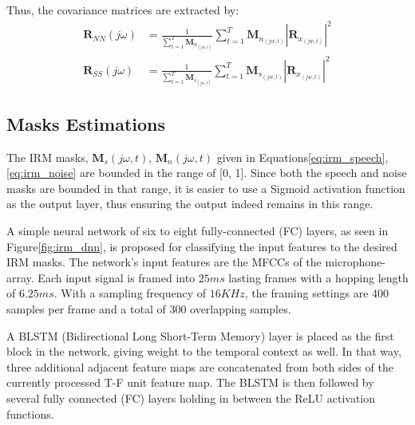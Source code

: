 %
Thus, the covariance matrices are extracted by:
\begin{align}
    \mathbf{R}_{NN}(j\omega) & = \frac{1}{\sum\limits_{t=1}^{T}\mathbf{M}_{n_{(jw, t)}}}\sum_{t=1}^{T}\mathbf{M}_{n_{(jw, t)}}|\mathbf{R}_{x_{(jw, t)}}|^2\\
    \mathbf{R}_{SS}(j\omega) & = \frac{1}{\sum\limits_{t=1}^{T}\mathbf{M}_{s_{(jw, t)}}}\sum_{t=1}^{T}\mathbf{M}_{s_{(jw, t)}}|\mathbf{R}_{x_{(jw, t)}}|^2
\end{align}

\subsection{Masks Estimations}
The IRM masks, \(\mathbf{M}_{s}(j\omega, t)\), \(\mathbf{M}_{n}(j\omega, t)\)
given in Equations\;\ref{eq:irm_speech}, \ref{eq:irm_noise} are bounded
in the range of [0, 1]. 
Since both the speech and noise masks are bounded in that range, it is easier
to use a Sigmoid activation function
as the output layer, 
thus ensuring the output indeed remains in this range.

A simple neural network of six to eight fully-connected (FC) layers,
as seen in Figure\;\ref{fig:irm_dnn}, is proposed for
classifying the input features to the desired IRM masks.
The network's input features are the MFCCs of the microphone-array.
Each input signal is framed into \(25ms\) lasting frames with a
hopping length of \(6.25ms\). With a sampling frequency of \(16KHz\), 
the framing settings are 400 samples per frame and 
a total of 300 overlapping samples. 

A BLSTM (Bidirectional Long Short-Term Memory)
layer is placed as the first block in the network,
giving weight to the temporal context as well.
In that way, three additional adjacent feature maps 
are concatenated from both sides of the currently 
processed T-F unit feature map.
The BLSTM is then followed 
by several fully connected (FC) layers 
holding in between the ReLU activation functions.

